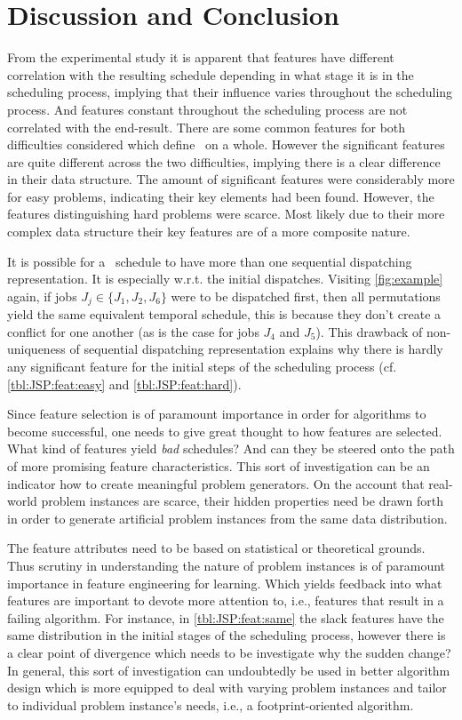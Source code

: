 \section{Discussion and Conclusion}
From the experimental study it is apparent that features have different %
correlation with the resulting schedule depending in what stage it is in the scheduling process, implying that their influence varies throughout the scheduling process. And features constant throughout the scheduling process are not correlated with the end-result.
There are some common features for both difficulties considered which define \JSP\ on a whole. However the significant features are quite different across the two difficulties, implying there is a clear difference in their data structure. The amount of significant features were considerably more for easy problems, indicating their key elements had been found. However, the features distinguishing hard problems were scarce. Most likely due to their more complex data structure their key features are of a more composite nature.

It is possible for a \JSP\ schedule to have more than one sequential dispatching representation. It is especially w.r.t. the initial dispatches. Visiting \cref{fig:example} again, if jobs $J_j\in\{J_1,J_2,J_6\}$ were to be dispatched first, then all permutations yield the same equivalent temporal schedule, this is because they don't create a conflict for one another (as is the case for jobs $J_4$ and $J_5$). This drawback of non-uniqueness of sequential dispatching representation explains why there is hardly any significant feature for the initial steps of the scheduling process (cf. \cref{tbl:JSP:feat:easy} and \cref{tbl:JSP:feat:hard}). 

Since feature selection is of paramount importance in order for algorithms to become successful, one needs to give great thought to how features are selected. What kind of features yield \emph{bad} schedules? And can they be steered onto the path of more promising feature characteristics. This sort of investigation can be an indicator how to create meaningful problem generators. On the account that real-world problem instances are scarce, their hidden properties need be drawn forth in order to generate artificial problem instances from the same data distribution. 

The feature attributes need to be based on statistical or theoretical grounds. Thus scrutiny in understanding the nature of problem instances is of paramount importance in feature engineering for learning. Which yields feedback into what features are important to devote more attention to, i.e., features that result in a failing algorithm. For instance, in \cref{tbl:JSP:feat:same} the slack features have the same distribution in the initial stages of the scheduling process, however there is a clear point of divergence which needs to be investigate why the sudden change? 
In general, this sort of investigation can undoubtedly be used in better algorithm design which is more equipped to deal with varying problem instances and tailor to individual problem instance's needs, i.e., a footprint-oriented algorithm. 

